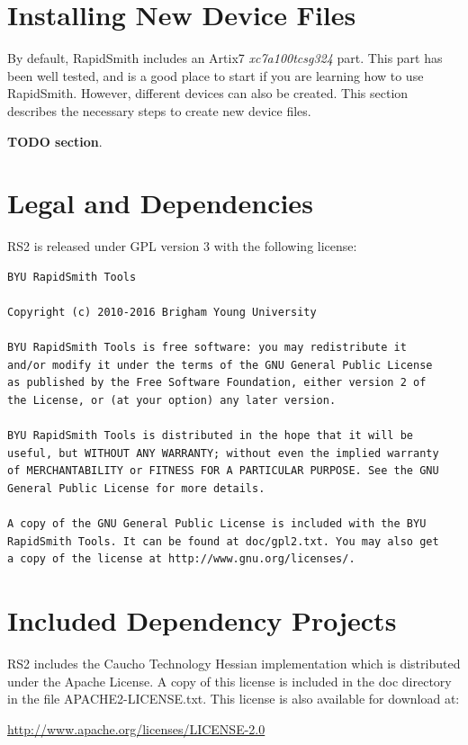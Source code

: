 \documentclass[10pt]{article}
\newcommand{\pgm}[1]{{\textbf{#1}}}
\begin{document}
\pagebreak
\section{Installing New Device Files}
By default, RapidSmith includes an Artix7 {\em xc7a100tcsg324} part.
This part has been well tested, and is a good place to start if you are
learning how to use RapidSmith. However, different devices can also be created.
This section describes the necessary steps to create new device files.

\pgm{TODO section}.

\pagebreak
\section{Legal and Dependencies}
RS2 is released under GPL version 3 with the following license: 

\begin{verbatim}
BYU RapidSmith Tools

Copyright (c) 2010-2016 Brigham Young University
   
BYU RapidSmith Tools is free software: you may redistribute it
and/or modify it under the terms of the GNU General Public License
as published by the Free Software Foundation, either version 2 of
the License, or (at your option) any later version.
   
BYU RapidSmith Tools is distributed in the hope that it will be
useful, but WITHOUT ANY WARRANTY; without even the implied warranty
of MERCHANTABILITY or FITNESS FOR A PARTICULAR PURPOSE. See the GNU
General Public License for more details.
   
A copy of the GNU General Public License is included with the BYU
RapidSmith Tools. It can be found at doc/gpl2.txt. You may also get
a copy of the license at http://www.gnu.org/licenses/.
\end{verbatim}

\pagebreak
\section{Included Dependency Projects}
RS2 includes the Caucho Technology Hessian implementation which is distributed
under the Apache License. A copy of this license is included in the doc
directory in the file APACHE2-LICENSE.txt. This license is also available for
download at:

\noindent
\hyperref[http://www.apache.org/licenses/LICENSE-2.0]{\color{blue}http://www.apache.org/licenses/LICENSE-2.0}
\end{document}
